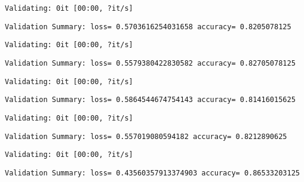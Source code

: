 \documentclass[11pt]{article}
\begin{document}
    
    \begin{Verbatim}[commandchars=\\\{\}]
Validating: 0it [00:00, ?it/s]
    \end{Verbatim}

    
    \begin{Verbatim}[commandchars=\\\{\}]
Validation Summary: loss= 0.5703616254031658 accuracy= 0.8205078125
    \end{Verbatim}

    
    \begin{Verbatim}[commandchars=\\\{\}]
Validating: 0it [00:00, ?it/s]
    \end{Verbatim}

    
    \begin{Verbatim}[commandchars=\\\{\}]
Validation Summary: loss= 0.5579380422830582 accuracy= 0.82705078125
    \end{Verbatim}

    
    \begin{Verbatim}[commandchars=\\\{\}]
Validating: 0it [00:00, ?it/s]
    \end{Verbatim}

    
    \begin{Verbatim}[commandchars=\\\{\}]
Validation Summary: loss= 0.5864544674754143 accuracy= 0.81416015625
    \end{Verbatim}

    
    \begin{Verbatim}[commandchars=\\\{\}]
Validating: 0it [00:00, ?it/s]
    \end{Verbatim}

    
    \begin{Verbatim}[commandchars=\\\{\}]
Validation Summary: loss= 0.557019080594182 accuracy= 0.8212890625
    \end{Verbatim}

    
    \begin{Verbatim}[commandchars=\\\{\}]
Validating: 0it [00:00, ?it/s]
    \end{Verbatim}

    
    \begin{Verbatim}[commandchars=\\\{\}]
Validation Summary: loss= 0.43560357913374903 accuracy= 0.86533203125
    \end{Verbatim}
\end{document}

